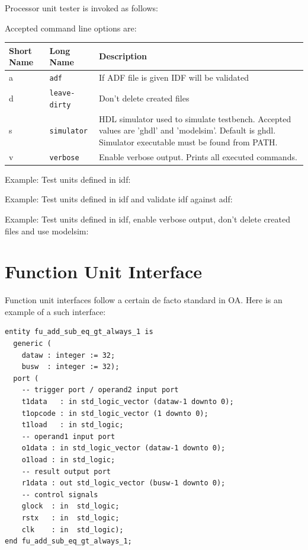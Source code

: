 \documentclass[a4paper,twoside]{tceusermanual}
\begin{document}
Processor unit tester is invoked as follows:


Accepted command line options are:

\begin{center}
\begin{longtable}[htb]{@{}p{}@{}p{}%
                     @{}p{}}

\textbf{Short Name} &\textbf{Long Name} &\textbf{Description} \\
\hline

a & \verb|adf| &
If ADF file is given IDF will be validated \\

d & \verb|leave-dirty| &
Don't delete created files \\

s & \verb|simulator| &
HDL simulator used to simulate testbench. Accepted values are 'ghdl' and
'modelsim'. Default is ghdl. Simulator executable must be found from PATH. \\

v & \verb|verbose| &
Enable verbose output. Prints all executed commands. \\

\end{longtable}
\end{center}

Example: Test units defined in idf:


Example: Test units defined in idf and validate idf against adf:


Example: Test units defined in idf, enable verbose output, don't delete created
files and use modelsim:



\section{Function Unit Interface}

Function unit interfaces follow a certain de facto standard in OA. Here is
an example of a such interface:

\begin{verbatim}
entity fu_add_sub_eq_gt_always_1 is
  generic (
    dataw : integer := 32;
    busw  : integer := 32);
  port (
    -- trigger port / operand2 input port
    t1data   : in std_logic_vector (dataw-1 downto 0);
    t1opcode : in std_logic_vector (1 downto 0);
    t1load   : in std_logic;
    -- operand1 input port
    o1data : in std_logic_vector (dataw-1 downto 0);
    o1load : in std_logic;
    -- result output port
    r1data : out std_logic_vector (busw-1 downto 0);
    -- control signals
    glock  : in  std_logic;
    rstx   : in  std_logic;
    clk    : in  std_logic);
end fu_add_sub_eq_gt_always_1;
\end{verbatim}
\end{document}
